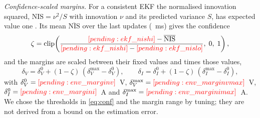 \emph{Confidence-scaled margins.} For a consistent EKF the normalised innovation squared, $\mathrm{NIS}=\nu^2/S$ with innovation $\nu$ and its predicted variance $S$, has expected value one \cite{barshalom2001estimation}. Its mean $\overline{\mathrm{NIS}}$ over the last  updates (~ms) gives the confidence
\begin{equation}
\zeta = \operatorname{clip}\!\left(\frac{\res{ekf_nishi}-\overline{\mathrm{NIS}}}{\res{ekf_nishi}-\res{ekf_nislo}},\;0,\;1\right),
\label{eq:conf}
\end{equation}
and the margins are scaled between their fixed values and  times those values,
\begin{equation}
\delta_V = \delta_V^0 + (1-\zeta)\,(\delta_V^{\max}-\delta_V^0), \qquad \delta_I = \delta_I^0 + (1-\zeta)\,(\delta_I^{\max}-\delta_I^0),
\label{eq:confmargin}
\end{equation}
with $\delta_V^0=\res{env_marginv}$~V, $\delta_V^{\max}=\res{env_marginvmax}$~V, $\delta_I^0=\res{env_margini}$~A and $\delta_I^{\max}=\res{env_marginimax}$~A. We chose the thresholds in \eqref{eq:conf} and the margin range by tuning; they are not derived from a bound on the estimation error.

